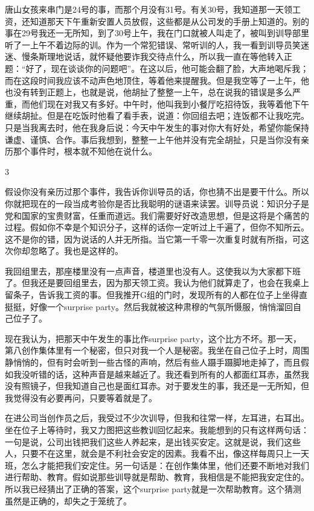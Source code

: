 唐山女孩来串门是24号的事，而那个月没有31号。有关30号，我知道那一天领工资，还知道那天下午重新安置人员放假，这些都是从公司发的手册上知道的。别的事在29号我还一无所知，到了30号上午，我在门口就被人叫走了，被叫到训导部里听了一上午不着边际的训。作为一个常犯错误、常听训的人，我一看到训导员笑迷迷、慢条斯理地说话，就怀疑他要诈我交待点什么，所以我一直在等他转入正题：“好了，现在谈谈你的问题吧”。在这以后，他可能会翻了脸，大声地喝斥我；而在这段时间我应该不动声色地顶住，等着他来提醒我。但是我空等了一上午，他也没有转到正题上，也就是说，他胡扯了整整一上午，总在说我的错误是多么严重，而他们现在对我又有多好。中午时，他叫我到小餐厅吃招待饭，我等着他下午继续胡扯。但是在吃饭时他看了看手表，说道：你回组去吧；连饭都不让我吃完。只是当我离去时，他在我身后说：今天中午发生的事对你大有好处，希望你能保持谦虚、谨慎、合作。事后我想到，整整一上午他并没有完全胡扯，只是当你没有亲历那个事件时，根本就不知他在说什么。 

3 

假设你没有亲历过那个事件，我告诉你训导员的话，你也猜不出是要干什么。所以你就把现在的一段当成考验你是否比我聪明的谜语来读罢。训导员说：知识分子是党和国家的宝贵财富，任重而道远。我们需要好好改造思想，但是这将是个痛苦的过程。假如你不幸是个知识分子，这样的话你一定听过上千遍了，但你不知所云。这不是你的错，因为说话的人并无所指。当它第一千零一次重复时就有所指，可这次你却忽略了。我也是这样的。 

我回组里去，那座楼里没有一点声音，楼道里也没有人。这使我以为大家都下班了。但我还是要回组里去，因为那天领工资。我认为他们就算走了，也会在我桌上留条子，告诉我工资的事。但我推开G组的门时，发现所有的人都在位子上坐得直挺挺，好像一个surprise party。然后我就被这种肃穆的气氛所慑服，悄悄溜回自己位子了。 

现在我认为，把那天中午发生的事比作surprise party，这个比方不坏。那一天，第八创作集体里有一个秘密，但只对我一个人是秘密。我坐在自己位子上时，周围静悄悄的，但有时会听到一些古怪的声响，然后有些人蹑手蹑脚地走掉了，而且假如我没听错的话，这种声音是越来越近了。我还看到所有的人都面红耳赤，虽然我没有照镜子，但我知道自己也是面红耳赤。对于要发生的事，我还是一无所知，但我觉得没有必要再问，只要等着就是了。 

在进公司当创作员之后，我受过不少次训导，但我和往常一样，左耳进，右耳出。坐在位子上等待时，我又力图把这些教训回忆起来。我能想到的只有这样两句话：一句是说，公司出钱把我们这些人养起来，是出钱买安定。这就是说，我们这些人，只要不在这里，就会是不利社会安定的因素。我看不出，像这样每周只上一天班，怎么才能把我们安定住。另一句话是：在创作集体里，他们还要不断地对我们进行帮助、教育。假如说那些训导就是帮助、教育，我相信是不能把我安定住的。所以我已经猜出了正确的答案，这个surprise party就是一次帮助教育。这个猜测虽然是正确的，却失之于笼统了。 

